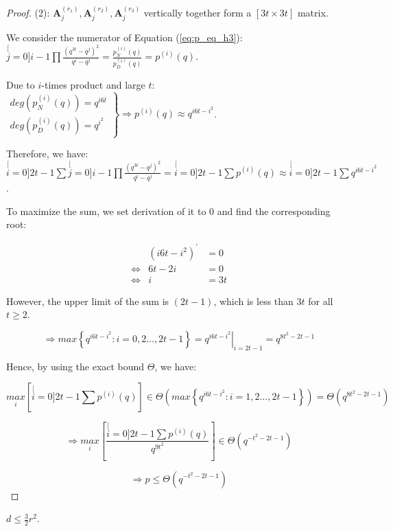 \begin{proof}
(2): $\boldsymbol{A}_{j}^{\left(r_{1}\right)},\boldsymbol{A}_{j}^{\left(r_{2}\right)},\boldsymbol{A}_{j}^{\left(r_{3}\right)}$
vertically together form a $\left[3t\times3t\right]$ matrix.

We consider the numerator of Equation (\ref{eq:p_eq_h3}): $\stackrel[j=0]{i-1}{\mathop{\prod}}\frac{\left(q^{3t}-q^{j}\right)^{2}}{q^{i}-q^{j}}=\frac{p_{N}^{(i)}(q)}{p_{D}^{(i)}(q)}=p^{(i)}(q)$.

Due to $i$-times product and large $t$: $\left.\begin{array}{c}
deg\left(p_{N}^{(i)}(q)\right)=q^{i6t}\\
deg\left(p_{D}^{(i)}(q)\right)=q^{i^{2}}
\end{array}\right\} \Rightarrow p^{(i)}(q)\approx q^{i6t-i^{2}}$.

Therefore, we have: $\stackrel[i=0]{2t-1}{\mathop{\sum}}\stackrel[j=0]{i-1}{\mathop{\prod}}\frac{\left(q^{3t}-q^{j}\right)^{2}}{q^{i}-q^{j}}=\stackrel[i=0]{2t-1}{\mathop{\sum}}p^{(i)}(q)\approx\stackrel[i=0]{2t-1}{\mathop{\sum}}q^{i6t-i^{2}}$.

To maximize the sum, we set derivation of it to 0 and find the corresponding
root: 

\begin{eqnarray*}
 & \left(i6t-i^{2}\right)^{'} & =0\\
\Leftrightarrow & 6t-2i & =0\\
\Leftrightarrow & i & =3t
\end{eqnarray*}

However, the upper limit of the sum is $\left(2t-1\right)$, which
is less than $3t$ for all $t\geq2$.

\[
\Rightarrow max\left\{ q^{i6t-i^{2}}:i=0,2\ldots,2t-1\right\} =\left.q^{i6t-i^{2}}\right|_{i=2t-1}=q^{8t^{2}-2t-1}
\]

Hence, by using the exact bound $\Theta$, we have:

\[
\underset{i}{max}\left[\stackrel[i=0]{2t-1}{\mathop{\sum}}p^{(i)}(q)\right]\in\Theta\left(max\left\{ q^{i6t-i^{2}}:i=1,2\ldots,2t-1\right\} \right)=\Theta\left(q^{8t^{2}-2t-1}\right)
\]

\[
\Rightarrow\underset{i}{max}\left[\frac{\stackrel[i=0]{2t-1}{\mathop{\sum}}p^{(i)}(q)}{q^{9t^{2}}}\right]\in\Theta\left(q^{-t^{2}-2t-1}\right)
\]

\[
\Rightarrow p\leq\Theta\left(q^{-t^{2}-2t-1}\right)
\]
\end{proof}
\begin{lem}
$d\leq\frac{3}{2}r^{2}$. \label{lem:dependecy_d_LLL}
\end{lem}
